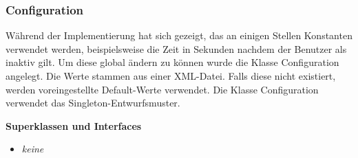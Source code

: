 \documentclass{article}
\begin{document}
    \subsubsection{Configuration}
    Während der Implementierung hat sich gezeigt, das an einigen Stellen Konstanten verwendet werden,
    beispielsweise die Zeit in Sekunden nachdem der Benutzer als inaktiv gilt. Um diese global ändern zu können
    wurde die Klasse Configuration angelegt. Die Werte stammen aus einer XML-Datei. Falls diese nicht existiert,
    werden voreingestellte Default-Werte verwendet. Die Klasse Configuration verwendet das Singleton-Entwurfsmuster.\newline

    \textbf{Superklassen und Interfaces}
      \begin{itemize}
        \item \textit{keine}
      \end{itemize}
           
\end{document}
